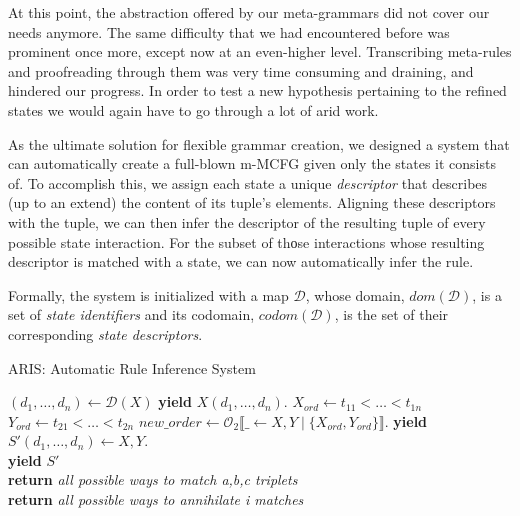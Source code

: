 \documentclass[nonatbib,numbers,10pt]{sigplanconf}
\newcommand{\Orderr}[5]{
	\mathcal{#1}_{#5}\llbracket #2 \leftarrow #3 \mid \{ #4 \} \rrbracket.
}
\newcommand{\Or}[4]{\Orderr{O}{#1}{#2}{#3}{#4}}
\begin{document}
At this point, the abstraction offered by our meta-grammars did not cover our needs anymore. The same difficulty that we had encountered before was prominent once more, except now at an even-higher level. Transcribing meta-rules and proofreading through them was very time consuming and draining, and hindered our progress. In order to test a new hypothesis pertaining to the refined states we would again have to go through a lot of arid work.

As the ultimate solution for flexible grammar creation, we designed a system that can automatically create a full-blown m-MCFG given only the states it consists of. To accomplish this, we assign each state a unique \textit{descriptor} that describes (up to an extend) the content of its tuple's elements. Aligning these descriptors with the tuple, we can then infer the descriptor of the resulting tuple of every possible state interaction. For the subset of thοse interactions whose resulting descriptor is matched with a state, we can now automatically infer the rule.

Formally, the system is initialized with a map $\mathcal{D}$, whose domain, $dom(\mathcal{D})$, is a set of \textit{state identifiers} and its codomain, $codom(\mathcal{D})$, is the set of their corresponding \textit{state descriptors}.

\begin{algorithm}
\caption{ARIS: Automatic Rule Inference System}\label{euclid}
\begin{algorithmic}
		\State $(d_1,\dots ,d_n) \leftarrow \mathcal{D}(X)$
		\State \textbf{yield} $X(d_1,\dots,d_n).$
	\EndFor
		\State $X_{ord} \leftarrow t_{11}<\dots<t_{1n}$ 
		\State $Y_{ord} \leftarrow t_{21}<\dots<t_{2n}$ 
		\State $new\_order \leftarrow \Or{\_}{X,Y}{X_{ord}, Y_{ord}}{2}$
				\State \textbf{yield} $S'(d_1,\dots ,d_n) \leftarrow X, Y.$
			\EndFor
		\EndFor
	\EndFor
\EndProcedure
\\
					\State \textbf{yield} $S'$
				\EndIf				
			\EndFor
		\EndFor
	\EndFor
\EndProcedure
\\
	\State \textbf{return} \textit{all possible ways to match a,b,c triplets}
\EndProcedure
\\
	\State \textbf{return} \textit{all possible ways to annihilate i matches}
\EndProcedure
\end{algorithmic}
\end{algorithm}
\end{document}

